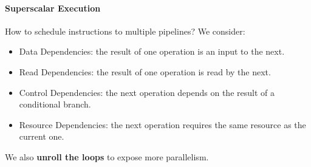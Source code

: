 \documentclass{../../ainote}
\begin{document}
\paragraph{Superscalar Execution}\mbox{}

How to schedule instructions to multiple pipelines? We consider:
\begin{itemize}
    \item Data Dependencies: the result of one operation is an input to the next.
    \item Read Dependencies: the result of one operation is read by the next.
    \item Control Dependencies: the next operation depends on the result of a conditional branch.
    \item Resource Dependencies: the next operation requires the same resource as the current one.
\end{itemize}

We also \textbf{unroll the loops} to expose more parallelism.
\end{document}
